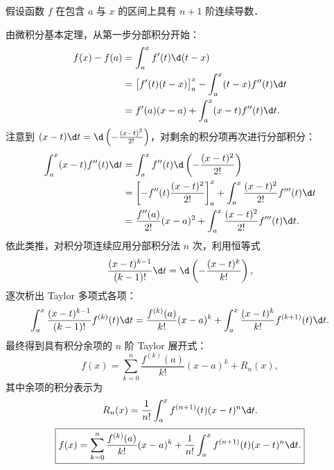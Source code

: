 \begin{solution}
    假设函数 $f$ 在包含 $a$ 与 $x$ 的区间上具有 $n + 1$ 阶连续导数．

    由微积分基本定理，从第一步分部积分开始：
    \begin{equation}
        \begin{aligned}
            f(x) - f(a) & = \int_a^x f'(t) \d(t - x)                                      \\
                        & = \bigl[ f'(t)(t - x) \bigr]_a^x - \int_a^x (t - x) f''(t) \d t \\
                        & = f'(a)(x - a) + \int_a^x (x - t) f''(t) \d t.
        \end{aligned}
    \end{equation}
    注意到 $(x - t) \d t = \d\left( -\frac{(x - t)^2}{2!} \right)$，对剩余的积分项再次进行分部积分：
    \begin{equation}
        \begin{aligned}
            \int_a^x (x - t) f''(t) \d t & = \int_a^x f''(t) \d\left( -\frac{(x - t)^2}{2!} \right)                                       \\
                                         & = \left[ -f''(t) \frac{(x - t)^2}{2!} \right]_a^x + \int_a^x \frac{(x - t)^2}{2!} f'''(t) \d t \\
                                         & = \frac{f''(a)}{2!}(x - a)^2 + \int_a^x \frac{(x - t)^2}{2!} f'''(t) \d t.
        \end{aligned}
    \end{equation}
    依此类推，对积分项连续应用分部积分法 $n$ 次，利用恒等式
    \begin{equation}
        \frac{(x - t)^{k-1}}{(k-1)!} \d t = \d\left( -\frac{(x - t)^k}{k!} \right),
    \end{equation}
    逐次析出 Taylor 多项式各项：
    \begin{equation}
        \int_a^x \frac{(x - t)^{k-1}}{(k-1)!} f^{(k)}(t) \d t = \frac{f^{(k)}(a)}{k!}(x - a)^k + \int_a^x \frac{(x - t)^k}{k!} f^{(k+1)}(t) \d t.
    \end{equation}
    最终得到具有积分余项的 $n$ 阶 Taylor 展开式：
    \begin{equation}
        f(x) = \sum_{k=0}^n \frac{f^{(k)}(a)}{k!}(x - a)^k + R_n(x),
    \end{equation}
    其中余项的积分表示为
    \begin{equation}
        R_n(x) = \frac{1}{n!} \int_a^x f^{(n+1)}(t)(x - t)^n \d t.
    \end{equation}
    \begin{equation}
        \boxed{f(x) = \sum_{k=0}^n \frac{f^{(k)}(a)}{k!}(x - a)^k + \frac{1}{n!} \int_a^x f^{(n+1)}(t)(x - t)^n \d t.}
    \end{equation}
\end{solution}

